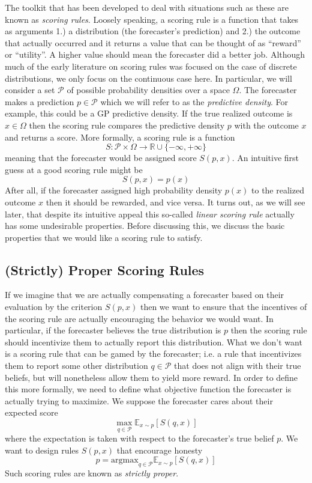 \documentclass[12pt]{article}
\newcommand{\E}{\mathbb{E}}
\newcommand{\R}{\mathbb{R}}
\begin{document}
The toolkit that has been developed to deal with situations such as these are known as \textit{scoring rules}. Loosely speaking, a scoring rule is a function that takes as arguments 1.) a distribution (the forecaster's prediction) and 
2.) the outcome that actually occurred and it returns a value that can be thought of as ``reward'' or ``utility''. A higher value should mean the forecaster did a better job. Although much of the early literature on scoring rules was focused 
on the case of discrete distributions, we only focus on the continuous case here. In particular, we will consider a set $\mathcal{P}$ of possible probability densities over a space $\Omega$. The forecaster makes a prediction $p \in \mathcal{P}$ which we will 
refer to as the \textit{predictive density}. For example, this could be a GP predictive density. If the true realized outcome is $x \in \Omega$ then the scoring rule compares the predictive density $p$ with the outcome $x$ and returns a score. More formally, 
a scoring rule is a function
\[S: \mathcal{P} \times \Omega \to \R \cup \{-\infty, +\infty\}\]
meaning that the forecaster would be assigned score $S(p, x)$. An intuitive first guess at a good scoring rule might be 
\[S(p, x) = p(x)\]
After all, if the forecaster assigned high probability density $p(x)$ to the realized outcome $x$ then it should be rewarded, and vice versa. It turns out, as we will see later, that despite its intuitive appeal this so-called \textit{linear scoring rule} 
actually has some undesirable properties. Before discussing this, we discuss the basic properties that we would like a scoring rule to satisfy. 

\subsection{(Strictly) Proper Scoring Rules}
If we imagine that we are actually compensating a forecaster based on their evaluation by the criterion $S(p, x)$ then we want to ensure that the incentives of the scoring rule are actually encouraging the behavior we would want. 
In particular, if the forecaster believes the true distribution is $p$ then the scoring rule should incentivize them to actually report this distribution. What we don't want is a scoring rule that can be gamed by the forecaster; i.e. a rule that 
incentivizes them to report some other distribution $q \in \mathcal{P}$ that does not align with their true beliefs, but will nonetheless allow them to yield more reward. In order to define this more formally, we need to define what objective 
function the forecaster is actually trying to maximize. We suppose the forecaster cares about their expected score 
\[\max_{q \in \mathcal{P}}\E_{x \sim p}\left[S(q, x) \right] \] 
where the expectation is taken with respect to the forecaster's true belief $p$. We want to design rules $S(p, x)$ that encourage honesty
\[p = \text{argmax}_{q \in \mathcal{P}}\E_{x \sim p}\left[S(q, x) \right] \]
Such scoring rules are known as \textit{strictly proper}. 
\end{document}
